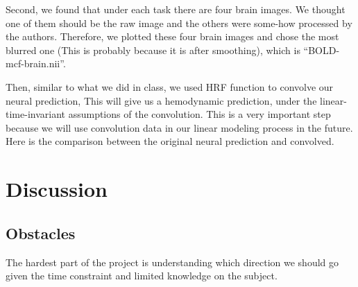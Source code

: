 \documentclass[11pt]{article} \usepackage{graphicx} \graphicspath{ {images/} }
\begin{document}
Second, we found that under each task there are four brain images. We thought
one of them should be the raw image and the others were some-how processed by
the authors. Therefore, we plotted these four brain images and chose the most
blurred one (This is probably because it is after smoothing), which is
``BOLD-mcf-brain.nii''. 

Then, similar to what we did in class, we used HRF function to convolve our
neural prediction, This will give us a hemodynamic prediction, under the
linear-time-invariant assumptions of the convolution. This is a very important
step because we will use convolution data in our linear modeling process in the
future. Here is the comparison between the original neural prediction and
convolved.  \section{Discussion} 

\subsection{Obstacles} 

The hardest part of the project is understanding which direction we should go
given the time constraint and limited knowledge on the subject. 


\end{document}

